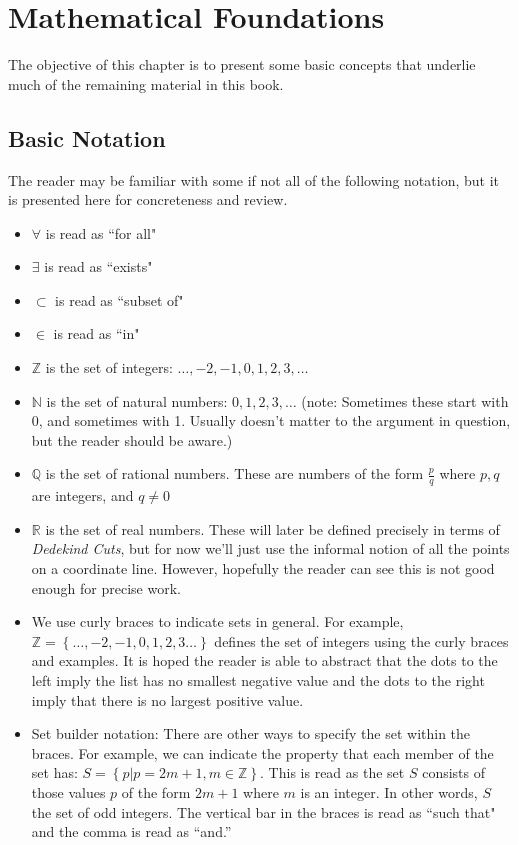 \chapter{Mathematical Foundations}

The objective of this chapter is to present some basic concepts that underlie much of the remaining material in this book.

\section{Basic Notation}

The reader may be familiar with some if not all of the following notation, but it is presented here for concreteness and review.

\begin{itemize}
\item $\forall$ is read as ``for all"  
\item $\exists$ is read as ``exists"    
\item $\subset$ is read as ``subset of"  
\item $\in$ is read as ``in"  
\item $\mathbb{Z}$ is the set of integers: $\ldots, -2,-1,0,1,2, 3, \ldots$
\item $\mathbb{N}$ is the set of natural numbers: $0,1,2, 3, \ldots$ (note: Sometimes these start with 0, and sometimes with 1.  Usually doesn't matter to the argument in question, but the reader should be aware.)
\item $\mathbb{Q}$ is the set of rational numbers.  These are numbers of the form $\frac{p}{q}$ where $p,q$ are integers, and $q \ne 0$
\item $\mathbb{R}$ is the set of real numbers.  These will later be defined precisely in terms of \textit{Dedekind Cuts}, but for now we'll just use the informal notion of all the points on a coordinate line.  However, hopefully the reader can see this is not good enough for precise work.
\item We use curly braces to indicate sets in general.  For example, $\mathbb{Z}=\left\{\ldots, -2,-1,0,1,2,3 \ldots\right\}$ defines the set of integers using the curly braces and examples.  It is hoped the reader is able to abstract that the dots to the left imply the list has no smallest negative value and the dots to the right imply that there is no largest positive value.  
\item Set builder notation:  There are other ways to specify the set within the braces.  For example, we can indicate the property that each member of the set has:  $S = \left\{p | p=2m+1, m \in \mathbb{Z} \right\}.$  This is read as the set $S$ consists of those values $p$ of the form $2m+1$ where $m$ is an integer.  In other words, $S$ the set of odd integers.  The vertical bar in the braces is read as ``such that" and the comma is read as ``and.''
\end{itemize}

